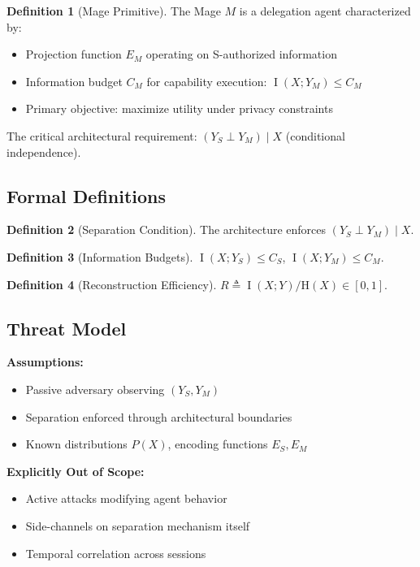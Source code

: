 \documentclass[11pt,a4paper]{article}
\theoremstyle{definition}
\newtheorem{definition}{Definition}[section]
\DeclareMathOperator{\I}{I}
\newcommand{\Entropy}{\mathrm{H}}
\newcommand{\given}{\mid}
\newcommand{\indep}{\perp}
\begin{document}
\begin{definition}[Mage Primitive]
The Mage $M$ is a delegation agent characterized by:
\begin{itemize}
    \item Projection function $E_M$ operating on S-authorized information
    \item Information budget $C_M$ for capability execution: $\I(X; Y_M) \leq C_M$
    \item Primary objective: maximize utility under privacy constraints
\end{itemize}
\end{definition}

The critical architectural requirement: $(Y_S \indep Y_M) \given X$ (conditional independence).

\subsection{Formal Definitions}

\begin{definition}[Separation Condition]
The architecture enforces $(Y_S \indep Y_M) \given X$.
\end{definition}

\begin{definition}[Information Budgets]
$\I(X; Y_S) \leq C_S$, $\I(X; Y_M) \leq C_M$.
\end{definition}

\begin{definition}[Reconstruction Efficiency]
$R \triangleq \I(X; Y)/\Entropy(X) \in [0, 1]$.
\end{definition}

\subsection{Threat Model}

\textbf{Assumptions:}

\begin{itemize}
    \item Passive adversary observing $(Y_S, Y_M)$
    \item Separation enforced through architectural boundaries
    \item Known distributions $P(X)$, encoding functions $E_S, E_M$
\end{itemize}

\textbf{Explicitly Out of Scope:}

\begin{itemize}
    \item Active attacks modifying agent behavior
    \item Side-channels on separation mechanism itself
    \item Temporal correlation across sessions
\end{itemize}
\end{document}
